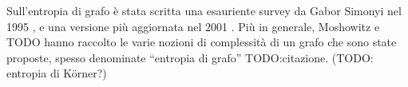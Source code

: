 Sull'entropia di grafo \`e stata scritta una esauriente survey da Gabor Simonyi nel 1995 \cite{Simonyi1995}, e una versione pi\`u aggiornata nel 2001 \cite{Simonyi2001}. Pi\`u in generale, Moshowitz e TODO hanno raccolto le varie nozioni di complessit\`a di un grafo che sono state proposte, spesso denominate ``entropia di grafo'' TODO:citazione. (TODO: entropia di K\"orner?)

